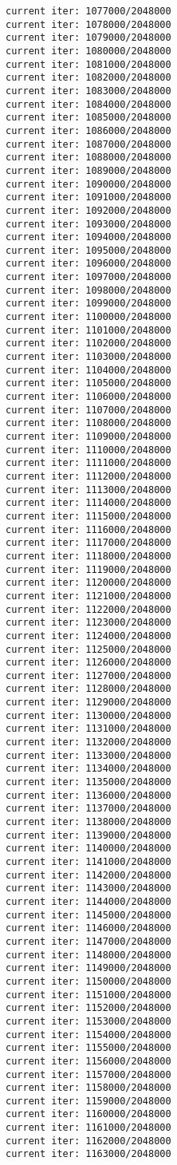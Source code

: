 \documentclass[11pt]{article}
\begin{document}
\begin{Verbatim}[commandchars=\\\{\}]
current iter: 1077000/2048000
current iter: 1078000/2048000
current iter: 1079000/2048000
current iter: 1080000/2048000
current iter: 1081000/2048000
current iter: 1082000/2048000
current iter: 1083000/2048000
current iter: 1084000/2048000
current iter: 1085000/2048000
current iter: 1086000/2048000
current iter: 1087000/2048000
current iter: 1088000/2048000
current iter: 1089000/2048000
current iter: 1090000/2048000
current iter: 1091000/2048000
current iter: 1092000/2048000
current iter: 1093000/2048000
current iter: 1094000/2048000
current iter: 1095000/2048000
current iter: 1096000/2048000
current iter: 1097000/2048000
current iter: 1098000/2048000
current iter: 1099000/2048000
current iter: 1100000/2048000
current iter: 1101000/2048000
current iter: 1102000/2048000
current iter: 1103000/2048000
current iter: 1104000/2048000
current iter: 1105000/2048000
current iter: 1106000/2048000
current iter: 1107000/2048000
current iter: 1108000/2048000
current iter: 1109000/2048000
current iter: 1110000/2048000
current iter: 1111000/2048000
current iter: 1112000/2048000
current iter: 1113000/2048000
current iter: 1114000/2048000
current iter: 1115000/2048000
current iter: 1116000/2048000
current iter: 1117000/2048000
current iter: 1118000/2048000
current iter: 1119000/2048000
current iter: 1120000/2048000
current iter: 1121000/2048000
current iter: 1122000/2048000
current iter: 1123000/2048000
current iter: 1124000/2048000
current iter: 1125000/2048000
current iter: 1126000/2048000
current iter: 1127000/2048000
current iter: 1128000/2048000
current iter: 1129000/2048000
current iter: 1130000/2048000
current iter: 1131000/2048000
current iter: 1132000/2048000
current iter: 1133000/2048000
current iter: 1134000/2048000
current iter: 1135000/2048000
current iter: 1136000/2048000
current iter: 1137000/2048000
current iter: 1138000/2048000
current iter: 1139000/2048000
current iter: 1140000/2048000
current iter: 1141000/2048000
current iter: 1142000/2048000
current iter: 1143000/2048000
current iter: 1144000/2048000
current iter: 1145000/2048000
current iter: 1146000/2048000
current iter: 1147000/2048000
current iter: 1148000/2048000
current iter: 1149000/2048000
current iter: 1150000/2048000
current iter: 1151000/2048000
current iter: 1152000/2048000
current iter: 1153000/2048000
current iter: 1154000/2048000
current iter: 1155000/2048000
current iter: 1156000/2048000
current iter: 1157000/2048000
current iter: 1158000/2048000
current iter: 1159000/2048000
current iter: 1160000/2048000
current iter: 1161000/2048000
current iter: 1162000/2048000
current iter: 1163000/2048000

\end{Verbatim}
\end{document}
